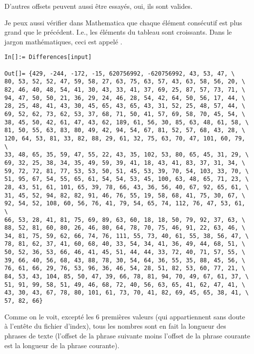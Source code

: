 D'autres offsets peuvent aussi être essayés, oui, ils sont valides.

Je peux aussi vérifier dans Mathematica que chaque élément consécutif est plus grand
que le précédent.
I.e., les éléments du tableau sont croissants.
Dans le jargon mathématiques, ceci est appelé .

\begin{lstlisting}[style=custommath]
In[]:= Differences[input]

Out[]= {429, -244, -172, -15, 620756992, -620756992, 43, 53, 47, \
80, 53, 52, 52, 47, 59, 58, 27, 63, 75, 63, 57, 43, 63, 58, 56, 20, \
82, 46, 40, 48, 54, 41, 30, 43, 33, 41, 37, 69, 25, 87, 57, 73, 71, \
94, 47, 50, 50, 21, 36, 29, 24, 46, 28, 54, 42, 64, 50, 56, 17, 44, \
28, 25, 48, 41, 43, 30, 45, 65, 43, 65, 43, 31, 52, 25, 48, 57, 44, \
69, 52, 62, 73, 62, 53, 37, 68, 71, 50, 41, 57, 69, 58, 70, 45, 54, \
38, 45, 50, 42, 61, 47, 43, 62, 189, 61, 56, 30, 85, 63, 48, 61, 58, \
81, 50, 55, 63, 83, 80, 49, 42, 94, 54, 67, 81, 52, 57, 68, 43, 28, \
120, 64, 53, 81, 33, 82, 88, 29, 61, 32, 75, 63, 70, 47, 101, 60, 79, \
33, 48, 65, 35, 59, 47, 55, 22, 43, 35, 102, 53, 80, 65, 45, 31, 29, \
69, 32, 25, 38, 34, 35, 49, 59, 39, 41, 18, 43, 41, 83, 37, 31, 34, \
59, 72, 72, 81, 77, 53, 53, 50, 51, 45, 53, 39, 70, 54, 103, 33, 70, \
51, 95, 67, 54, 55, 65, 61, 54, 54, 53, 45, 100, 63, 48, 65, 71, 23, \
28, 43, 51, 61, 101, 65, 39, 78, 66, 43, 36, 56, 40, 67, 92, 65, 61, \
31, 45, 52, 94, 82, 82, 91, 46, 76, 55, 19, 58, 68, 41, 75, 30, 67, \
92, 54, 52, 108, 60, 56, 76, 41, 79, 54, 65, 74, 112, 76, 47, 53, 61, \
66, 53, 28, 41, 81, 75, 69, 89, 63, 60, 18, 18, 50, 79, 92, 37, 63, \
88, 52, 81, 60, 80, 26, 46, 80, 64, 78, 70, 75, 46, 91, 22, 63, 46, \
34, 81, 75, 59, 62, 66, 74, 76, 111, 55, 73, 40, 61, 55, 38, 56, 47, \
78, 81, 62, 37, 41, 60, 68, 40, 33, 54, 34, 41, 36, 49, 44, 68, 51, \
50, 52, 36, 53, 66, 46, 41, 45, 51, 44, 44, 33, 72, 40, 71, 57, 55, \
39, 66, 40, 56, 68, 43, 88, 78, 30, 54, 64, 36, 55, 35, 88, 45, 56, \
76, 61, 66, 29, 76, 53, 96, 36, 46, 54, 28, 51, 82, 53, 60, 77, 21, \
84, 53, 43, 104, 85, 50, 47, 39, 66, 78, 81, 94, 70, 49, 67, 61, 37, \
51, 91, 99, 58, 51, 49, 46, 68, 72, 40, 56, 63, 65, 41, 62, 47, 41, \
43, 30, 43, 67, 78, 80, 101, 61, 73, 70, 41, 82, 69, 45, 65, 38, 41, \
57, 82, 66}
\end{lstlisting}

Comme on le voit, excepté les 6 premières valeurs (qui appartiennent sans doute à
l'entête du fichier d'index), tous les nombres sont en fait la longueur des phrases
de texte (l'offset de la phrase suivante moins l'offset de la phrase courante est
la longueur de la phrase courante).

